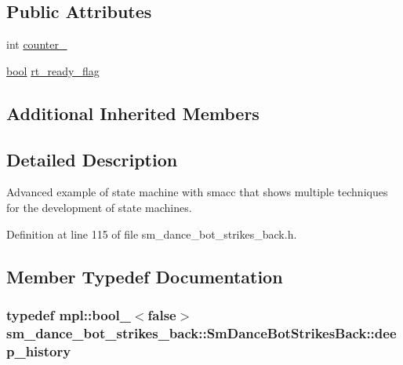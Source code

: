 \subsection*{Public Attributes}
\begin{DoxyCompactItemize}
\item 
int \hyperlink{structsm__dance__bot__strikes__back_1_1SmDanceBotStrikesBack_a0cf56e316022dde4b3da552ab9f68513}{counter\+\_}
\item 
\hyperlink{classbool}{bool} \hyperlink{structsm__dance__bot__strikes__back_1_1SmDanceBotStrikesBack_a609265a94c2575580fbb014f551a066a}{rt\+\_\+ready\+\_\+flag}
\end{DoxyCompactItemize}
\subsection*{Additional Inherited Members}


\subsection{Detailed Description}
Advanced example of state machine with smacc that shows multiple techniques for the development of state machines. 

Definition at line 115 of file sm\+\_\+dance\+\_\+bot\+\_\+strikes\+\_\+back.\+h.



\subsection{Member Typedef Documentation}
\subsubsection[{\texorpdfstring{deep\+\_\+history}{deep_history}}]{\setlength{\rightskip}{0pt plus 5cm}typedef mpl\+::bool\+\_\+$<$false$>$ {\bf sm\+\_\+dance\+\_\+bot\+\_\+strikes\+\_\+back\+::\+Sm\+Dance\+Bot\+Strikes\+Back\+::deep\+\_\+history}}\hypertarget{structsm__dance__bot__strikes__back_1_1SmDanceBotStrikesBack_a3192d4079cbcf0739c7002538767ad22}{}\label{structsm__dance__bot__strikes__back_1_1SmDanceBotStrikesBack_a3192d4079cbcf0739c7002538767ad22}


